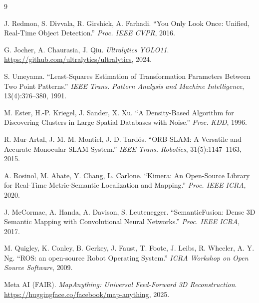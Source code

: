\documentclass[10pt,a4paper,twocolumn]{article}
\begin{document}
\small
\setlength{\itemsep}{0pt}
\begin{thebibliography}{9}

J. Redmon, S. Divvala, R. Girshick, A. Farhadi.
``You Only Look Once: Unified, Real-Time Object Detection.''
\textit{Proc. IEEE CVPR}, 2016.

G. Jocher, A. Chaurasia, J. Qiu.
\textit{Ultralytics YOLO11}.
\url{https://github.com/ultralytics/ultralytics}, 2024.

S. Umeyama.
``Least-Squares Estimation of Transformation Parameters Between Two Point Patterns.''
\textit{IEEE Trans. Pattern Analysis and Machine Intelligence}, 13(4):376--380, 1991.

M. Ester, H.-P. Kriegel, J. Sander, X. Xu.
``A Density-Based Algorithm for Discovering Clusters in Large Spatial Databases with Noise.''
\textit{Proc. KDD}, 1996.

R. Mur-Artal, J. M. M. Montiel, J. D. Tardós.
``ORB-SLAM: A Versatile and Accurate Monocular SLAM System.''
\textit{IEEE Trans. Robotics}, 31(5):1147--1163, 2015.

A. Rosinol, M. Abate, Y. Chang, L. Carlone.
``Kimera: An Open-Source Library for Real-Time Metric-Semantic Localization and Mapping.''
\textit{Proc. IEEE ICRA}, 2020.

J. McCormac, A. Handa, A. Davison, S. Leutenegger.
``SemanticFusion: Dense 3D Semantic Mapping with Convolutional Neural Networks.''
\textit{Proc. IEEE ICRA}, 2017.

M. Quigley, K. Conley, B. Gerkey, J. Faust, T. Foote, J. Leibs, R. Wheeler, A. Y. Ng.
``ROS: an open-source Robot Operating System.''
\textit{ICRA Workshop on Open Source Software}, 2009.

Meta AI (FAIR).
\textit{MapAnything: Universal Feed-Forward 3D Reconstruction}.
\url{https://huggingface.co/facebook/map-anything}, 2025.

\end{thebibliography}
\end{document}
